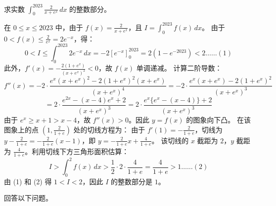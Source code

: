 \begin{questions}
\question
求实数 $\int_0^{2023} \frac{2}{x+e^x} \, dx$ 的整数部分。
\begin{solution}
    在 $0 \le x \le 2023$ 中，由于 $f(x) = \frac{2}{x+e^x}$，且 $I = \int_0^{2023} f(x) \, dx$。
    由于 $0 < f(x) \le \frac{2}{e^x} = 2e^{-x}$，得：
    \[
    0 < I \le \int_0^{2023} 2e^{-x} \, dx = -2\left[e^{-x}\right]_0^{2023} = 2(1-e^{-2023}) < 2 \dots \dots (1)
    \]
    此外，$f'(x) = -\frac{2(1+e^x)}{(x+e^x)^2} < 0$，故 $f(x)$ 单调递减。
    计算二阶导数：
    \[
    f''(x) = -2 \cdot \frac{e^x(x+e^x)^2 - 2(1+e^x)^2(x+e^x)}{(x+e^x)^4} = -2 \cdot \frac{e^x(x+e^x) - 2(1+e^x)^2}{(x+e^x)^3}
    \]
    \[
    = 2 \cdot \frac{e^{2x} - (x-4)e^x + 2}{(x+e^x)^3} = 2 \cdot \frac{e^x\{e^x - (x-4)\} + 2}{(x+e^x)^3}
    \]
    由于 $e^x \ge x+1 > x-4$，故 $f''(x) > 0$。因此 $y = f(x)$ 的图象向下凸。
    在该图象上的点 $\left(1, \frac{2}{1+e}\right)$ 处的切线方程为：
    由于 $f'(1) = -\frac{2}{1+e}$，切线为 $y - \frac{2}{1+e} = -\frac{2}{1+e}(x-1)$，即 $y = -\frac{2}{1+e}x + \frac{4}{1+e}$。
    该切线的 $x$ 截距为 $2$，$y$ 截距为 $\frac{4}{1+e}$。利用切线下方三角形面积估算：
    \[
    I > \int_0^2 f(x) \, dx > \frac{1}{2} \cdot 2 \cdot \frac{4}{1+e} = \frac{4}{1+e} > 1 \dots \dots (2)
    \]
    由 (1) 和 (2) 得 $1 < I < 2$，因此 $I$ 的整数部分是 $1$。
\end{solution}

\question
回答以下问题。
\end{questions}
